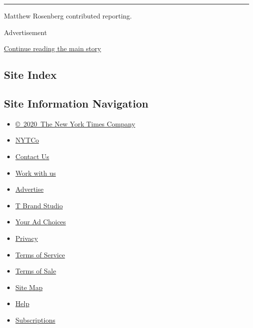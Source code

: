 \begin{center}\rule{0.5\linewidth}{\linethickness}\end{center}

Matthew Rosenberg contributed reporting.

Advertisement

\protect\hyperlink{after-bottom}{Continue reading the main story}

\hypertarget{site-index}{%
\subsection{Site Index}\label{site-index}}

\hypertarget{site-information-navigation}{%
\subsection{Site Information
Navigation}\label{site-information-navigation}}

\begin{itemize}
\tightlist
\item
  \href{https://help.nytimes.com/hc/en-us/articles/115014792127-Copyright-notice}{©~2020~The
  New York Times Company}
\end{itemize}

\begin{itemize}
\tightlist
\item
  \href{https://www.nytco.com/}{NYTCo}
\item
  \href{https://help.nytimes.com/hc/en-us/articles/115015385887-Contact-Us}{Contact
  Us}
\item
  \href{https://www.nytco.com/careers/}{Work with us}
\item
  \href{https://nytmediakit.com/}{Advertise}
\item
  \href{http://www.tbrandstudio.com/}{T Brand Studio}
\item
  \href{https://www.nytimes.com/privacy/cookie-policy\#how-do-i-manage-trackers}{Your
  Ad Choices}
\item
  \href{https://www.nytimes.com/privacy}{Privacy}
\item
  \href{https://help.nytimes.com/hc/en-us/articles/115014893428-Terms-of-service}{Terms
  of Service}
\item
  \href{https://help.nytimes.com/hc/en-us/articles/115014893968-Terms-of-sale}{Terms
  of Sale}
\item
  \href{https://spiderbites.nytimes.com}{Site Map}
\item
  \href{https://help.nytimes.com/hc/en-us}{Help}
\item
  \href{https://www.nytimes.com/subscription?campaignId=37WXW}{Subscriptions}
\end{itemize}
